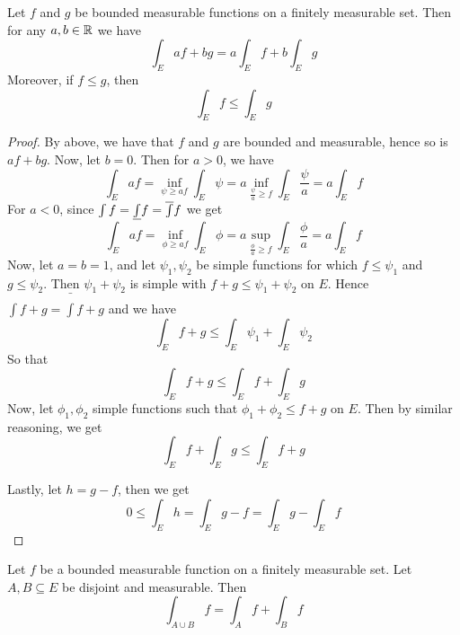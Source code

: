 \begin{theorem}\label{10.1.5}
    Let $f$ and  $g$ be bounded measurable functions on a finitely measurable
    set. Then for any  $a,b \in \mathbb{R}$ we have
    \begin{equation*}
        \int_E{af+bg}=a\int_E{f}+b\int_E{g}
    \end{equation*}
    Moreover, if $f \leq g$, then
    \begin{equation*}
        \int_E{f} \leq \int_E{g}
    \end{equation*}
\end{theorem}
\begin{proof}
    By above, we have that $f$ and $g$ are bounded and measurable, hence so is
    $af+bg$. Now, let $b=0$. Then for  $a>0$, we have
    \begin{equation*}
        \int_E{af}=\inf_{\psi \geq af}{\int_E{\psi}}
        =a\inf_{\frac{\psi}{a} \geq f}{\int_E{\frac{\psi}{a}}}=a\int_E{f}
    \end{equation*}
    For $a<0$, since  $\int{f}=\underline{\int}{f}=\overline{\int}{f}$ we get
    \begin{equation*}
        \int_E{af}=\inf_{\phi \geq af}{\int_E{\phi}}
        =a\sup_{\frac{\phi}{a} \geq f}{\int_E{\frac{\phi}{a}}}=a\int_E{f}
    \end{equation*}
    Now, let $a=b=1$, and let  $\psi_1,\psi_2$ be simple functions for which $f
    \leq \psi_1$ and $g \leq \psi_2$. Then $\psi_1+\psi_2$ is simple with $f+g
    \leq \psi_1+\psi_2$ on $E$. Hence  $\int{f+g}=\bar{\int}{f+g}$ and we have
    \begin{equation*}
        \int_E{f+g} \leq \int_E{\psi_1}+\int_E{\psi_2}
    \end{equation*}
    So that
    \begin{equation*}
        \int_E{f+g} \leq \int_E{f}+\int_E{g}
    \end{equation*}
    Now, let $\phi_1, \phi_2$ simple functions such that $\phi_1+\phi_2 \leq
    f+g$ on $E$. Then by similar reasoning, we get
    \begin{equation*}
        \int_E{f}+\int_E{g} \leq \int_E{f+g}
    \end{equation*}

    Lastly, let $h=g-f$, then we get
    \begin{equation*}
        0 \leq \int_E{h}=\int_E{g-f}=\int_E{g}-\int_E{f}
    \end{equation*}
\end{proof}
\begin{corollary}
    Let $f$ be a bounded measurable function on a finitely measurable set. Let
    $A,B \subseteq E$ be disjoint and measurable. Then
    \begin{equation*}
        \int_{A \cup B}{f}=\int_A{f}+\int_B{f}
    \end{equation*}
\end{corollary}
